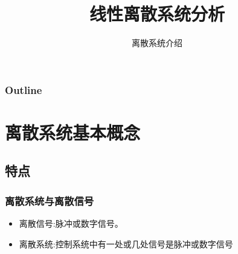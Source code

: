 \documentclass[table]{article}
\subtitle{离散系统介绍}
\title{线性离散系统分析}
\author{}
\date{}
\begin{document}
\maketitle

\begin{frame}
\frametitle{Outline}
\setcounter{tocdepth}{3}
\tableofcontents
\end{frame}













\section{离散系统基本概念}
\label{sec-1}
\subsection{特点}
\label{sec-1-1}
\begin{frame}
\frametitle{离散系统与离散信号}
\label{sec-1-1-1}

\begin{itemize}
\item <2->离散信号:脉冲或数字信号。
\item <3->离散系统:控制系统中有一处或几处信号是脉冲或数字信号
\end{itemize}
\end{frame}
\end{document}
